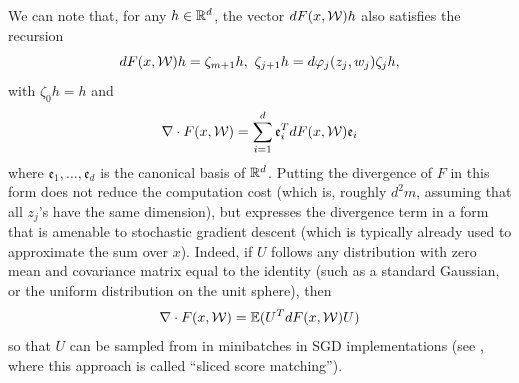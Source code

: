 We can note that, for any $h\in {\mathbb{R}}^d$, the vector $dF(x, {\mathcal W}) h$ also satisfies the recursion
\[
dF(x, {\mathcal W})h = \zeta_{m+1}h, \ \zeta_{j+1}h = d\varphi_j(z_j, w_{j})\zeta_jh,
\]
with $\zeta_0h = h$ and 
\[
\nabla \cdot  F(x,{\mathcal W}) = \sum_{i=1}^d \mathfrak e_i^T dF(x,{\mathcal W}) \mathfrak e_i
\]
where $\mathfrak e_1, \ldots, \mathfrak e_d$ is the canonical basis of ${\mathbb{R}}^d$. Putting the divergence of $F$ in this form does not reduce the computation cost (which is, roughly $d^2 m$, assuming that all $z_j$'s have the same dimension), but expresses the divergence term in a form that is amenable to stochastic gradient descent (which is typically already used to approximate the sum over $x$). Indeed, if $U$ follows any distribution with zero mean and covariance matrix equal to the identity (such as a standard Gaussian, or the uniform distribution on the unit sphere), then
\[
\nabla \cdot  F(x,{\mathcal W}) = \bm{\mathbb E}(U^T dF(x,{\mathcal W}) U)
\]
so that $U$ can be sampled from in minibatches in SGD implementations (see \citep{song2020sliced}, where this approach is called ``sliced score matching'').
